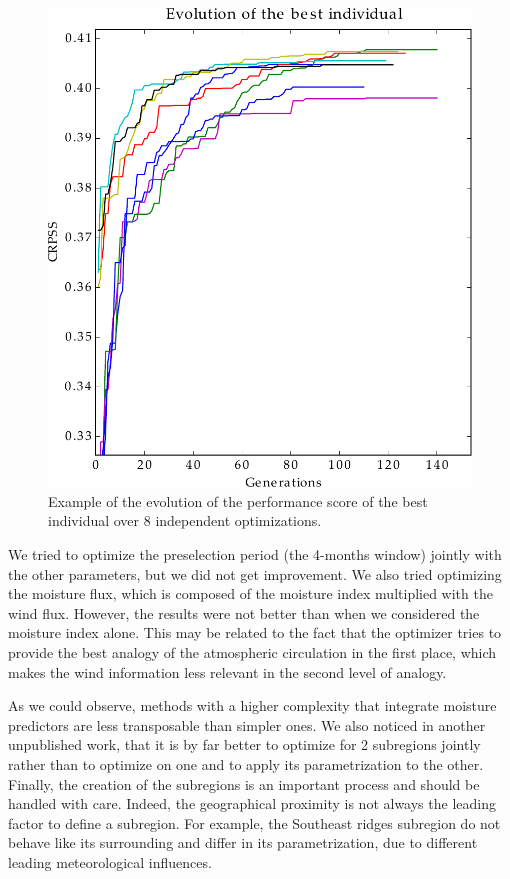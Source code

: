 \documentclass[5p]{elsarticle}
\begin{document}
\begin{figure}[htb]
	\centerline{\includegraphics[width=\linewidth]{figures/figure_evolution.pdf}}
	\caption{Example of the evolution of the performance score of the best individual over 8 independent optimizations.}
	\label{fig:evolution}
\end{figure}

We tried to optimize the preselection period (the 4-months window) jointly with the other parameters, but we did not get improvement. We also tried optimizing the moisture flux, which is composed of the moisture index multiplied with the wind flux. However, the results were not better than when we considered the moisture index alone. This may be related to the fact that the optimizer tries to provide the best analogy of the atmospheric circulation in the first place, which makes the wind information less relevant in the second level of analogy.

As we could observe, methods with a higher complexity that integrate moisture predictors are less transposable than simpler ones. We also noticed in another unpublished work, that it is by far better to optimize for 2 subregions jointly rather than to optimize on one and to apply its parametrization to the other. Finally, the creation of the subregions is an important process and should be handled with care. Indeed, the geographical proximity is not always the leading factor to define a subregion. For example, the Southeast ridges subregion do not behave like its surrounding and differ in its parametrization, due to different leading meteorological influences.
\end{document}
